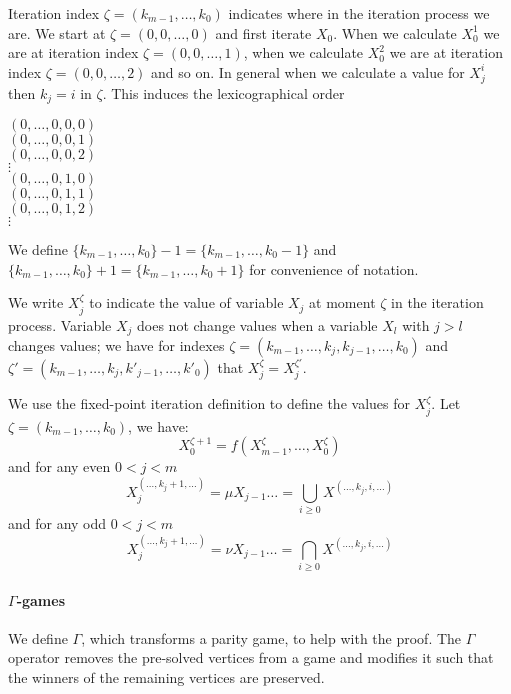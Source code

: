 Iteration index $\zeta = (k_{m-1},\dots,k_0)$ indicates where in the iteration process we are. We start at $\zeta = (0,0,\dots,0)$ and first iterate $X_0$. When we calculate $X_0^1$ we are at iteration index $\zeta=(0,0,\dots,1)$, when we calculate $X_0^2$ we are at iteration index $\zeta=(0,0,\dots,2)$ and so on. In general when we calculate a value for $X_j^i$ then $k_j = i$ in $\zeta$. This induces the lexicographical order 
\begin{center}
	$(0,\dots,0,0,0)$\\
	$(0,\dots,0,0,1)$\\
	$(0,\dots,0,0,2)$\\
	$\vdots$\\
	$(0,\dots,0,1,0)$\\
	$(0,\dots,0,1,1)$\\
	$(0,\dots,0,1,2)$\\
	$\vdots$
\end{center}
We define $\{k_{m-1},\dots,k_0\} -1 = \{k_{m-1},\dots,k_0-1\}$ and $\{k_{m-1},\dots,k_0\} + 1 = \{k_{m-1},\dots,k_0+1\}$ for convenience of notation.

We write $X_j^\zeta$ to indicate the value of variable $X_j$ at moment $\zeta$ in the iteration process. Variable $X_j$ does not change values when a variable $X_l$ with $j>l$ changes values; we have for indexes $\zeta = (k_{m-1},\dots,k_j,k_{j-1},\dots,k_0)$ and $\zeta' = (k_{m-1},\dots,k_j,k'_{j-1},\dots,k'_0)$ that $X_j^\zeta = X_j^{\zeta'}$.

We use the fixed-point iteration definition to define the values for $X_j^\zeta$. Let  $\zeta= (k_{m-1},\dots,k_0)$, we have:
\[ X_0^{\zeta+1} = f(X_{m-1}^\zeta,\dots,X_0^\zeta) \]
and for any even $0 < j < m$
\[ X_j^{(\dots,k_j+1,\dots)} = \mu X_{j-1}\dots = \bigcup_{i \geq 0}X^{(\dots,k_j,i,\dots)} \]
and for any odd $0 < j < m$
\[ X_j^{(\dots,k_j+1,\dots)} = \nu X_{j-1}\dots = \bigcap_{i \geq 0}X^{(\dots,k_j,i,\dots)} \]

\paragraph{$\Gamma$-games} 

We define $\Gamma$, which transforms a parity game, to help with the proof. The $\Gamma$ operator removes the pre-solved vertices from a game and modifies it such that the winners of the remaining vertices are preserved.

